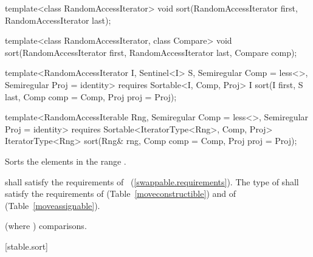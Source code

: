 %
\begin{removedblock}
\begin{itemdecl}
template<class RandomAccessIterator>
  void sort(RandomAccessIterator first, RandomAccessIterator last);

template<class RandomAccessIterator, class Compare>
  void sort(RandomAccessIterator first, RandomAccessIterator last,
            Compare comp);
\end{itemdecl}
\end{removedblock}
\begin{addedblock}
\begin{itemdecl}
template<RandomAccessIterator I, Sentinel<I> S, Semiregular Comp = less<>,
    Semiregular Proj = identity>
  requires Sortable<I, Comp, Proj>
  I sort(I first, S last, Comp comp = Comp{}, Proj proj = Proj{});

template<RandomAccessIterable Rng, Semiregular Comp = less<>, Semiregular Proj = identity>
  requires Sortable<IteratorType<Rng>, Comp, Proj>
  IteratorType<Rng>
    sort(Rng& rng, Comp comp = Comp{}, Proj proj = Proj{});
\end{itemdecl}
\end{addedblock}

\begin{itemdescr}
\pnum
\effects
Sorts the elements in the range
.

\begin{removedblock}
\pnum
\requires
{} shall satisfy the requirements of
~(\ref{swappable.requirements}). The type
of  shall satisfy the requirements of
 (Table~\ref{moveconstructible}) and of
 (Table~\ref{moveassignable}).
\end{removedblock}

\pnum
\complexity
{}
(where
)
comparisons.
\end{itemdescr}

[stable.sort]{}

